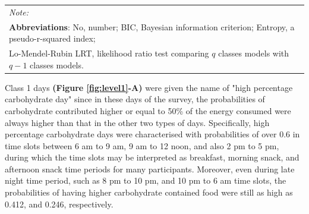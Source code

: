 \begin{table}[H]
\begin{tabular}[t]{lccccc}
		\bottomrule
		\multicolumn{6}{l}{{\scriptsize \textit{Note: }}}\\
		\multicolumn{6}{l}{{\scriptsize \textbf{Abbreviations}: No, number; BIC, Bayesian information criterion; Entropy, a pseudo-r-squared index;}}\\ 
		\multicolumn{6}{l}{{\scriptsize Lo-Mendel-Rubin LRT, likelihood ratio test comparing $q$ classes models with $q-1$ classes models.}}\\
	\end{tabular}
\end{table}

\vspace{-0.5cm}


Class 1 days \textbf{(Figure \ref{fig:level1}-A)} were given the name of "high percentage carbohydrate day" since in these days of the survey, the probabilities of carbohydrate contributed higher or equal to 50\% of the energy consumed were always higher than that in the other two types of days. Specifically, high percentage carbohydrate days were characterised with probabilities of over 0.6 in time slots between 6 am to 9 am, 9 am to 12 noon, and also 2 pm to 5 pm, during which the time slots may be interpreted as breakfast, morning snack, and afternoon snack time periods for many participants. Moreover, even during late night time period, such as 8 pm to 10 pm, and 10 pm to 6 am time slots, the probabilities of having higher carbohydrate contained food were still as high as 0.412, and 0.246, respectively.





